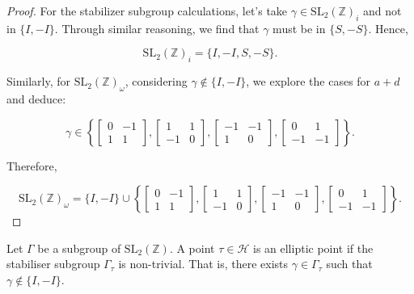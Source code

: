 \begin{proposition}
\begin{proof}
For the stabilizer subgroup calculations, let's take \( \gamma \in \mathrm{SL}_{2}(\mathbb{Z})_{i} \) and not in \( \{I, -I\} \). Through similar reasoning, we find that \( \gamma \) must be in \( \{S, -S\} \). Hence,

\[
\mathrm{SL}_{2}(\mathbb{Z})_{i} = \{I, -I, S, -S\}.
\]

Similarly, for \( \mathrm{SL}_{2}(\mathbb{Z})_{\omega} \), considering \( \gamma \notin \{I, -I\} \), we explore the cases for \( a + d \) and deduce:

\[
\gamma \in \left\{\left[\begin{array}{cc}
0 & -1 \\
1 & 1
\end{array}\right], \left[\begin{array}{cc}
1 & 1 \\
-1 & 0
\end{array}\right], \left[\begin{array}{cc}
-1 & -1 \\
1 & 0
\end{array}\right], \left[\begin{array}{cc}
0 & 1 \\
-1 & -1
\end{array}\right]\right\}.
\]

Therefore,

\[
\mathrm{SL}_{2}(\mathbb{Z})_{\omega} = \{I, -I\} \cup \left\{\left[\begin{array}{cc}
0 & -1 \\
1 & 1
\end{array}\right], \left[\begin{array}{cc}
1 & 1 \\
-1 & 0
\end{array}\right], \left[\begin{array}{cc}
-1 & -1 \\
1 & 0
\end{array}\right], \left[\begin{array}{cc}
0 & 1 \\
-1 & -1
\end{array}\right]\right\}.
\]
\end{proof}
\end{proposition}


\begin{definition}
    Let $\Gamma$ be a subgroup of $\mathrm{SL}_{2}(\mathbb{Z})$. A point $\tau \in \mathcal{H}$ is an elliptic point if the stabiliser subgroup $\Gamma_{\tau}$ is non-trivial. That is, there exists $\gamma \in \Gamma_{\tau}$ such that $\gamma \notin\{I,-I\}$.
\end{definition}



